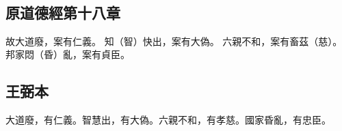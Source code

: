 ﻿%
%

\chapter{~}

\section{原道德經第十八章}

\begin{withgezhu}

\zhsong


故大道廢，案有仁義。
知（\textcolor{tongjia-color}{智}）快出，案有\colorbox{missing-color}{大偽}。
六親不和，案有畜茲（\textcolor{tongjia-color}{慈}）。
邦家悶（\textcolor{tongjia-color}{昏}）亂，案有貞臣。

\end{withgezhu}

\section{王弼本}

\begin{withgezhu}

\zhsong

大道廢，有仁義。智慧出，有大偽。六親不和，有孝慈。國家昏亂，有忠臣。

\end{withgezhu}
